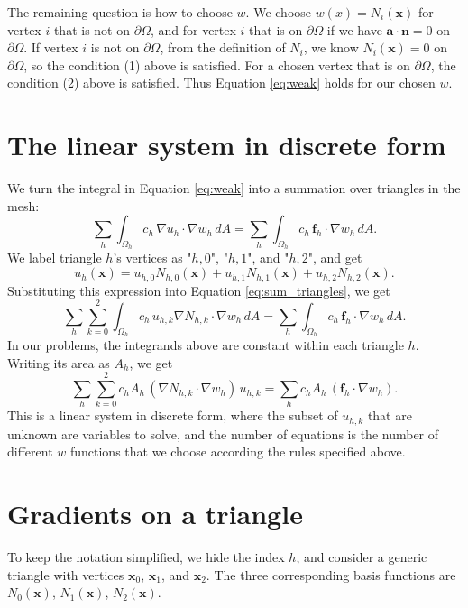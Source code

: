 \documentclass[11pt]{article}
\begin{document}
The remaining question is how to choose $w$. We choose $w(x) = N_i(\bm x)$
for vertex $i$ that is not on $\partial\Omega$, and for vertex $i$ that is
on $\partial\Omega$ if we have $\bm a\cdot\bm n=0$ on $\partial\Omega$.
If vertex $i$ is not on $\partial\Omega$, from the definition of $N_i$, we know
$N_i(\bm x)=0$ on $\partial\Omega$, so the condition (1) above is satisfied.
For a chosen vertex that is on $\partial\Omega$, the condition (2) above is
satisfied. Thus Equation \ref{eq:weak} holds for our chosen $w$.

\section{The linear system in discrete form}
We turn the integral in Equation \ref{eq:weak} into a summation over
triangles in the mesh:
\begin{equation}
    \sum_h \int_{\Omega_h} c_h\,\nabla u_h\cdot\nabla w_h\,dA
 =\sum_h \int_{\Omega_h} c_h\,\bm f_h\cdot\nabla w_h\,dA.
 \label{eq:sum_triangles}
\end{equation}
We label triangle $h$'s vertices as "$h,0$", "$h,1$", and "$h,2$", and get
\begin{equation}
    u_h(\bm x)=u_{h,0}N_{h,0}(\bm x)+u_{h,1}N_{h,1}(\bm x)+u_{h,2}N_{h,2}(\bm x).
\end{equation}
Substituting this expression into Equation \ref{eq:sum_triangles}, we get
\begin{equation}
    \sum_h\sum_{k=0}^2 \int_{\Omega_h}c_h\, u_{h,k}\nabla N_{h,k}\cdot\nabla w_h\,dA
 =\sum_h \int_{\Omega_h}c_h\,\bm f_h\cdot\nabla w_h\,dA.
\end{equation}
In our problems, the integrands above are constant within each triangle $h$.
Writing its area as $A_h$, we get
\begin{equation}
    \sum_h\sum_{k=0}^2 c_hA_h\, (\nabla N_{h,k}\cdot\nabla w_h)\, u_{h,k}
    =\sum_h c_hA_h\,(\bm f_h\cdot\nabla w_h).
\end{equation}
This is a linear system in discrete form, where the subset of $u_{h,k}$ that are
unknown are variables to solve, and the number of equations is the number of different
$w$ functions that we choose according the rules specified above.

\section{Gradients on a triangle}
To keep the notation simplified, we hide the index $h$, and consider a
generic triangle with vertices $\bm x_0$, $\bm x_1$, and $\bm x_2$.
The three corresponding basis functions are $N_0(\bm x)$, $N_1(\bm x)$,
$N_2(\bm x)$.
\end{document}
